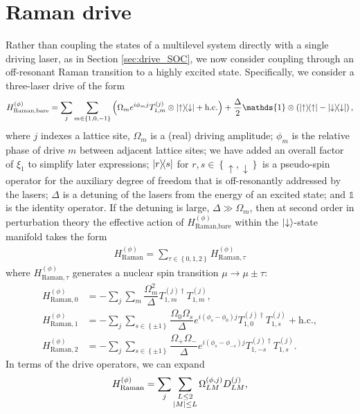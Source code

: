 \documentclass[nofootinbib,notitlepage,11pt]{revtex4-2}
\renewcommand{\t}{\text} %
\newcommand{\f}[2]{\dfrac{#1}{#2}} %
\newcommand{\p}[1]{\left(#1\right)} %
\renewcommand{\set}[1]{\left\{#1\right\}} %
\newcommand{\1}{\mathds{1}}
\newcommand{\up}{\uparrow}
\newcommand{\dn}{\downarrow}
\begin{document}
\section{Raman drive}
\label{sec:drive_raman}

Rather than coupling the states of a multilevel system directly with a
single driving laser, as in Section \ref{sec:drive_SOC}, we now
consider coupling through an off-resonant Raman transition to a highly
excited state.  Specifically, we consider a three-laser drive of the
form
\begin{align}
  H_{\t{Raman,bare}}^{(\phi)}
  = \sum_j \sum_{m\in\set{1,0,-1}} \p{\Omega_m e^{i\phi_m j}
    T_{1,m}^{(j)} \otimes \op{\up}{\dn} + \t{h.c.}}
  + \f{\Delta}{2} \1 \otimes \p{\op{\up} - \op{\dn}},
  \label{eq:raman_bare}
\end{align}
where $j$ indexes a lattice site, $\Omega_m$ is a (real) driving
amplitude; $\phi_m$ is the relative phase of drive $m$ between
adjacent lattice sites; we have added an overall factor of $\xi_1$ to
simplify later expressions; $\op{r}{s}$ for $r,s\in\set{\up,\dn}$ is a
pseudo-spin operator for the auxiliary degree of freedom that is
off-resonantly addressed by the lasers; $\Delta$ is a detuning of the
lasers from the energy of an excited state; and $\1$ is the identity
operator.  If the detuning is large, $\Delta\gg\Omega_m$, then at
second order in perturbation theory the effective action of
$H_{\t{Raman,bare}}^{(\phi)}$ within the $\ket{\dn}$-state manifold
takes the form
\begin{align}
  H_{\t{Raman}}^{(\phi)}
  = \sum_{\tau\in\set{0,1,2}} H_{\t{Raman},\tau}^{(\phi)}
\end{align}
where $H_{\t{Raman},\tau}^{(\phi)}$ generates a nuclear spin
transition $\mu\to\mu\pm\tau$:
\begin{align}
  H_{\t{Raman},0}^{(\phi)}
  &= -\sum_j\sum_m \f{\Omega_m^2}{\Delta}
  T_{1,m}^{(j)\dag} T_{1,m}^{(j)},
  \label{eq:raman_0} \\
  H_{\t{Raman},1}^{(\phi)}
  &= -\sum_j\sum_{s\in\set{\pm1}}
  \f{\Omega_0\Omega_s}{\Delta} e^{i\p{\phi_s-\phi_0} j}
  T_{1,0}^{(j)\dag} T_{1,s}^{(j)} + \t{h.c.},
  \\
  H_{\t{Raman},2}^{(\phi)}
  &= -\sum_j\sum_{s\in\set{\pm1}}
  \f{\Omega_+\Omega_-}{\Delta} e^{i\p{\phi_s-\phi_{-s}}j}
  T_{1,-s}^{(j)\dag} T_{1,s}^{(j)}.
  \label{eq:raman_2}
\end{align}
In terms of the drive operators, we can expand
\begin{align}
  H_{\t{Raman}}^{(\phi)}
  = \sum_j \sum_{\substack{L\le2\\\abs{M}\le L}}
  \Omega_{LM}^{(\phi,j)} D_{LM}^{(j)},
  \label{eq:raman_drive}
\end{align}
\end{document}
